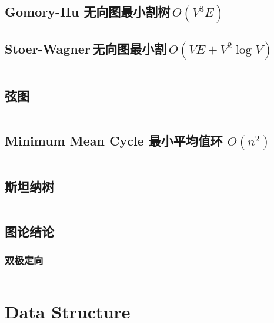 \documentclass[titlepage, a4paper]{article}
\begin{document}
\begin{multicols}{2}
\begin{spacing}{0.6}
				\subsection{Gomory-Hu 无向图最小割树\,$O(V ^ 3 E)$}
					
				\subsection{Stoer-Wagner\,无向图最小割\,$O(VE + V ^ 2 \log V)$}
					\inputminted{cpp}{src/yzh/Stoer-Wagner.cpp}
				\subsection{弦图}
					
					\inputminted{cpp}{src/TreeandGraph/弦图.cpp}
				\subsection{Minimum Mean Cycle 最小平均值环 $O(n^2)$}
					\inputminted{cpp}{src/TreeandGraph/MeanCycle.cpp}
				\subsection{斯坦纳树}
					\inputminted{cpp}{src/TreeandGraph/斯坦纳树.cpp}
				\subsection{图论结论}
					
					
					
					
					
					
					\subsubsection{双极定向}
					\inputminted{cpp}{src/tbr/bipolar_orientation.cpp}
					

			\section{Data Structure}

\end{spacing}
\end{multicols}
\end{document}
